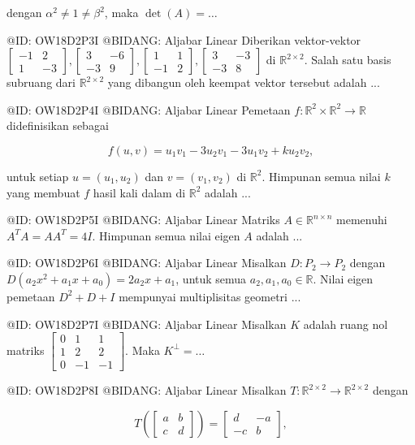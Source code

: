 dengan $\alpha^2 \ne 1 \ne \beta^2$, maka $\det(A) = \dots$

@ID: OW18D2P3I
@BIDANG: Aljabar Linear
Diberikan vektor-vektor $\begin{bmatrix} -1 & 2 \\ 1 & -3 \end{bmatrix}, \begin{bmatrix} 3 & -6 \\ -3 & 9 \end{bmatrix}, \begin{bmatrix} 1 & 1 \\ -1 & 2 \end{bmatrix}, \begin{bmatrix} 3 & -3 \\ -3 & 8 \end{bmatrix}$ di $\mathbb{R}^{2 \times 2}$. Salah satu basis subruang dari $\mathbb{R}^{2 \times 2}$ yang dibangun oleh keempat vektor tersebut adalah ...

@ID: OW18D2P4I
@BIDANG: Aljabar Linear
Pemetaan $f: \mathbb{R}^2 \times \mathbb{R}^2 \to \mathbb{R}$ didefinisikan sebagai 

$$
f(u, v) = u_1 v_1 - 3u_2 v_1 - 3u_1 v_2 + k u_2 v_2,
$$

untuk setiap $u = (u_1, u_2)$ dan $v = (v_1, v_2)$ di $\mathbb{R}^2$. Himpunan semua nilai $k$ yang membuat $f$ hasil kali dalam di $\mathbb{R}^2$ adalah ...

@ID: OW18D2P5I
@BIDANG: Aljabar Linear
Matriks $A \in \mathbb{R}^{n \times n}$ memenuhi $A^T A = A A^T = 4I$. Himpunan semua nilai eigen $A$ adalah ...

@ID: OW18D2P6I
@BIDANG: Aljabar Linear
Misalkan $D: P_2 \to P_2$ dengan $D(a_2 x^2 + a_1 x + a_0) = 2a_2 x + a_1$, untuk semua $a_2, a_1, a_0 \in \mathbb{R}$. Nilai eigen pemetaan $D^2 + D + I$ mempunyai multiplisitas geometri ...

@ID: OW18D2P7I
@BIDANG: Aljabar Linear
Misalkan $K$ adalah ruang nol matriks $\begin{bmatrix} 0 & 1 & 1 \\ 1 & 2 & 2 \\ 0 & -1 & -1 \end{bmatrix}$. Maka $K^\perp = \dots$

@ID: OW18D2P8I
@BIDANG: Aljabar Linear
Misalkan $T: \mathbb{R}^{2 \times 2} \to \mathbb{R}^{2 \times 2}$ dengan 

$$
T\left(\begin{bmatrix} a & b \\ c & d \end{bmatrix}\right) = \begin{bmatrix} d & -a \\ -c & b \end{bmatrix},
$$

